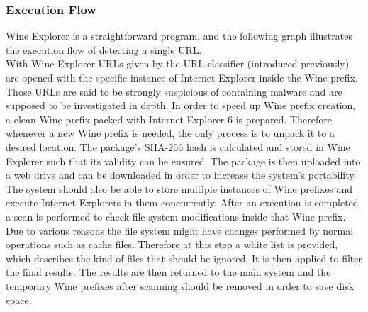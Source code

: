 \subsubsection{Execution Flow}
Wine Explorer is a straightforward program, and the following graph 
illustrates the execution flow of detecting a single URL. \\
With Wine Explorer URLs given by the URL classifier (introduced 
previously) are opened with the specific instance of Internet Explorer inside the Wine 
prefix. 
Those URLs are said to be strongly suspicious of containing malware and are 
supposed to be investigated in depth. 
In order to speed up Wine prefix creation, a clean Wine prefix packed with 
Internet Explorer 6 is prepared. Therefore whenever a new Wine prefix is needed, 
the only process is to unpack it to a desired location. 
The package's SHA-256 hash is calculated and stored in Wine Explorer such that 
its validity can be ensured. 
The package is then uploaded into a web drive and can be downloaded in 
order to increase the system's portability. \\
The system should also be able to store multiple instances of Wine prefixes 
and execute Internet Explorers in them concurrently. 
After an execution is completed a scan is performed to check file system 
modifications inside that Wine prefix. 
Due to various reasons the file system might have changes performed by normal 
operations such as cache files. 
Therefore at this step a white list is provided, which describes the kind of 
files that should be ignored. It is then applied to filter the final results. 
The results are then returned to the main system and the temporary Wine 
prefixes after scanning should be removed in order to save disk space. 

